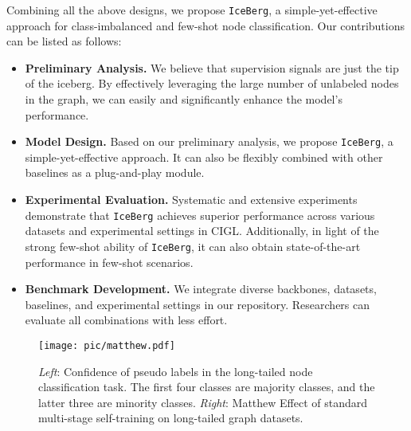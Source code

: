 Combining all the above designs, we propose \texttt{IceBerg}, a simple-yet-effective approach for class-imbalanced and few-shot node classification. Our contributions can be listed as follows:
\begin{itemize}[leftmargin=*]
    \item \textbf{Preliminary Analysis.} We believe that supervision signals are just the tip of the iceberg. By effectively leveraging the large number of unlabeled nodes in the graph, we can easily and significantly enhance the model's performance.
    \item \textbf{Model Design.} Based on our preliminary analysis, we propose \texttt{IceBerg}, a simple-yet-effective approach. It can also be flexibly combined with other baselines as a plug-and-play module.
    \item \textbf{Experimental Evaluation.} Systematic and extensive experiments demonstrate that \texttt{IceBerg} achieves superior performance across various datasets and experimental settings in CIGL. Additionally, in light of the strong few-shot ability of \texttt{IceBerg}, it can also obtain state-of-the-art performance in few-shot scenarios.
    \item \textbf{Benchmark Development.} We integrate diverse backbones, datasets, baselines, and experimental settings in our repository. Researchers can evaluate all combinations with less effort.
\end{itemize}



\begin{figure}[t]
\centering
\texttt{[image: pic/matthew.pdf]}
\caption{\emph{Left}: Confidence of pseudo labels in the long-tailed node classification task. The first four classes are majority classes, and the latter three are minority classes. \emph{Right}: Matthew Effect of standard multi-stage self-training on long-tailed graph datasets.}
\label{fig:matthew}
\end{figure}
